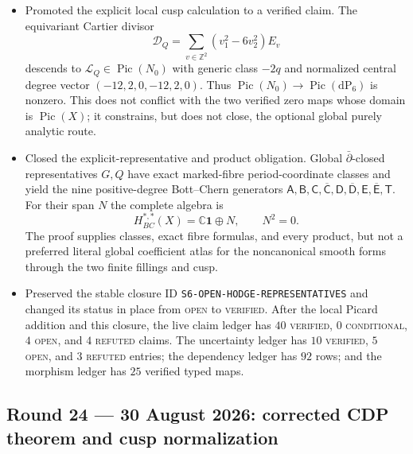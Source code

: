 \begin{itemize}[leftmargin=1.8em]
\item Promoted the explicit local cusp calculation to a verified claim.  The
equivariant Cartier divisor
\[
 \mathcal D_Q=\sum_{v\in\mathbb Z^2}(v_1^2-6v_2^2)E_v
\]
descends to $\mathcal L_Q\in\operatorname{Pic}(N_0)$ with generic class
$-2q$ and normalized central degree vector
$(-12,2,0,-12,2,0)$.  Thus
$\operatorname{Pic}(N_0)\to\operatorname{Pic}(\mathrm{dP}_6)$ is nonzero.
This does not conflict with the two verified zero maps whose domain is
$\operatorname{Pic}(X)$; it constrains, but does not close, the optional
global purely analytic route.
\item Closed the explicit-representative and product obligation.  Global
$\bar\partial$-closed representatives $G,Q$ have exact marked-fibre
period-coordinate classes and yield the nine positive-degree Bott--Chern
generators
$\mathsf A,\mathsf B,\mathsf C,\overline{\mathsf C},
\mathsf D,\overline{\mathsf D},
\mathsf E,\overline{\mathsf E},\mathsf T$.
For their span $N$ the complete algebra is
\[
 H^{*,*}_{BC}(X)=\mathbb C\mathbf1\oplus N,
 \qquad N^2=0.
\]
The proof supplies classes, exact fibre formulas, and every product, but not
a preferred literal global coefficient atlas for the noncanonical smooth
forms through the two finite fillings and cusp.
\item Preserved the stable closure ID
\texttt{S6-OPEN-HODGE-REPRESENTATIVES} and changed its status in place from
\textsc{open} to \textsc{verified}.  After the local Picard addition and this
closure, the live claim ledger has \(40\) \textsc{verified}, \(0\)
\textsc{conditional}, \(4\) \textsc{open}, and \(4\) \textsc{refuted}
claims.  The uncertainty ledger has \(10\) \textsc{verified}, \(5\)
\textsc{open}, and \(3\) \textsc{refuted} entries; the dependency ledger has
\(92\) rows; and the morphism ledger has \(25\) verified typed maps.
\end{itemize}

\subsection*{Round 24 --- 30 August 2026: corrected CDP theorem and cusp normalization}

